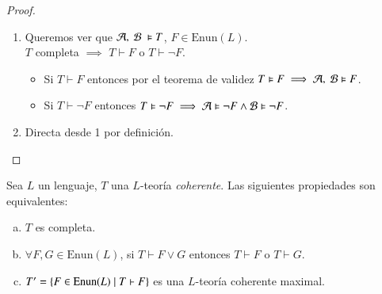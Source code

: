 \begin{proof}
    \begin{enumerate}
        \item Queremos ver que $\mtc A,\ \mtc B\ \vDash T$, $F \in \mathrm{Enun}(L)$.\\
        $T$ completa $\implies$ $T \vdash F$ o $T \vdash \neg F$.
        \begin{itemize}
            \item Si $T \vdash F$ entonces por el teorema de validez $T \vDash F \implies \mathcal{A},\ \mathcal{B} \vDash F$.
            \item Si $T \vdash \neg F$ entonces $T \vDash \neg F \implies \mathcal{A} \vDash \neg F \land \mathcal{B} \vDash \neg F$.
        \end{itemize}
        \item Directa desde 1 por definición.
    \end{enumerate}
\end{proof}

\begin{pro}\label{pro:3.3}
    Sea $L$ un lenguaje, $T$ una $L$-teoría \textit{coherente}. Las siguientes propiedades son equivalentes:
    \begin{enumerate}[(a)]
        \item $T$ es completa.
        \item $\forall F,G \in \mathrm{Enun}(L)$, si $T \vdash F \lor G$ entonces $T \vdash F$ o $T \vdash G$.
        \item $T' = \left\{F \in \mathrm{Enun}(L) \mid T \vdash F\right\}$ es una $L$-teoría coherente maximal.
    \end{enumerate}
\end{pro}

